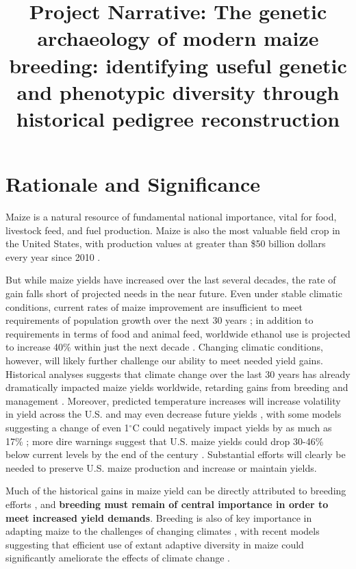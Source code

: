 \documentclass[12pt]{article}
\begin{document}
\title{Project Narrative: The genetic archaeology of modern maize breeding: identifying useful genetic and phenotypic diversity through historical pedigree reconstruction}
\author{}
\date{}
\maketitle

\section*{Rationale and Significance}
\label{rationale}

Maize is a natural resource of fundamental national importance, vital for food, livestock feed, and fuel production.
Maize is also the most valuable field crop in the United States, with production values at greater than \$50 billion dollars every year since 2010 \citep{usdanass}. 

But while maize yields have increased over the last several decades, the rate of gain falls short of projected needs in the near future.
Even under stable climatic conditions, current rates of maize improvement are insufficient to meet requirements of population growth over the next 30 years \citep{ray2013yield}; in  addition to requirements in terms of food and animal feed, worldwide ethanol use is projected to increase 40\% within just the next decade \citep{usdalong}.
Changing climatic conditions, however, will likely further challenge our ability to meet needed yield gains. 
Historical analyses suggests that climate change over the last 30 years has already dramatically impacted maize yields worldwide, retarding gains from breeding and management \citep{Lobell2011}.
Moreover, predicted temperature increases will increase volatility in yield across the U.S. and may even decrease future yields \citep{urban2012projected}, with some models suggesting a change of even 1$^{\circ}$C could negatively impact yields by as much as 17\% \citep{lobell2003climate}; more dire warnings suggest that U.S. maize yields could drop 30-46\% below current levels by the end of the century \citep{schlenker2009nonlinear}.
Substantial efforts will clearly be needed to preserve U.S. maize production and increase or maintain yields.  

Much of the historical gains in maize yield can be directly attributed to breeding efforts \citep{Duvick1992, duvick2005genetic}, and \textbf{breeding must remain of central importance in order to meet increased yield demands}.  
Breeding is also of key importance in adapting maize to the challenges of changing climates \citep{Troyer2004a}, with recent models suggesting that efficient use of extant adaptive diversity in maize could significantly ameliorate the effects of climate change \citep{butler2013adaptation}. 
\end{document}
